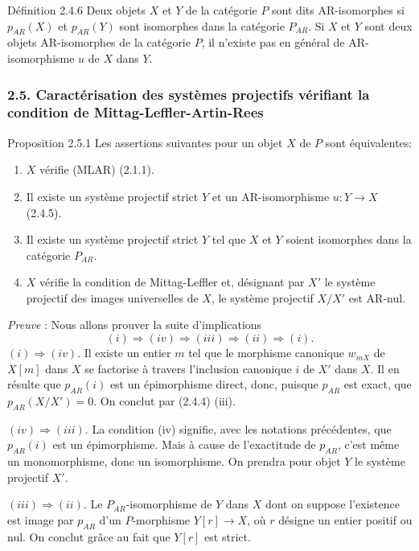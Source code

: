 \begin{statement}{Définition 2.4.6}
Deux objets $X$ et $Y$ de la catégorie $P$ sont dits AR-isomorphes si $p_{AR}(X)$ et $p_{AR}(Y)$ sont isomorphes dans la catégorie $P_{AR}$. Si $X$ et $Y$ sont deux objets AR-isomorphes de la catégorie $P$, il n'existe pas en général de AR-isomorphisme $u$ de $X$ dans $Y$.
\end{statement}

\subsubsection*{2.5. Caractérisation des systèmes projectifs vérifiant la condition de Mittag-Leffler-Artin-Rees}
\begin{statement}{Proposition 2.5.1}
Les assertions suivantes pour un objet $X$ de $P$ sont équivalentes:
\begin{enumerate}[label=(\roman*)]
\item $X$ vérifie (MLAR) (2.1.1).
\item Il
existe un système projectif strict $Y$ et un AR-isomorphisme $u:Y\to X$ (2.4.5).
\item Il existe un système projectif strict $Y$ tel que $X$ et $Y$ soient isomorphes dans la catégorie $P_{AR}$.
\item $X$ vérifie la condition de Mittag-Leffler et, désignant par $X'$ le système projectif des images universelles de $X$, le système projectif $X/X'$ est AR-nul.
\end{enumerate}
\end{statement}

\emph{Preuve} : Nous allons prouver la suite d'implications
\[
(i)\Rightarrow(iv)\Rightarrow(iii)\Rightarrow(ii)\Rightarrow(i).
\]
$(i)\Rightarrow(iv)$. Il existe un entier $m$ tel que le morphisme canonique $w_{mX}$ de $X[m]$ dans $X$ se factorise à travers l'inclusion canonique $i$ de $X'$ dans $X$. Il en résulte que $p_{AR}(i)$ est un épimorphisme direct, donc, puisque $p_{AR}$ est exact, que $p_{AR}(X/X')=0$. On conclut par (2.4.4) (iii).

$(iv)\Rightarrow(iii)$. La condition (iv) signifie, avec les notations précédentes, que $p_{AR}(i)$ est un épimorphisme. Mais à cause de l'exactitude de $p_{AR}$, c'est même un monomorphisme, donc un isomorphisme. On prendra pour objet $Y$ le système projectif $X'$.

$(iii)\Rightarrow(ii)$. Le $P_{AR}$-isomorphisme de $Y$ dans $X$ dont on suppose l'existence est image par $p_{AR}$ d'un $P$-morphisme $Y[r]\to X$, où $r$ désigne un entier positif ou nul. On conclut grâce au fait que $Y[r]$ est strict.

